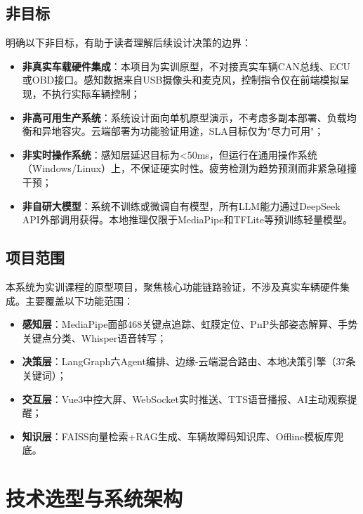 \documentclass[a4paper]{article}
\begin{document}
\subsection{非目标}

明确以下非目标，有助于读者理解后续设计决策的边界：

\begin{itemize}
    \item \textbf{非真实车载硬件集成}：本项目为实训原型，不对接真实车辆CAN总线、ECU或OBD接口。感知数据来自USB摄像头和麦克风，控制指令仅在前端模拟呈现，不执行实际车辆控制；
    \item \textbf{非高可用生产系统}：系统设计面向单机原型演示，不考虑多副本部署、负载均衡和异地容灾。云端部署为功能验证用途，SLA目标仅为"尽力可用"；
    \item \textbf{非实时操作系统}：感知层延迟目标为<50ms，但运行在通用操作系统（Windows/Linux）上，不保证硬实时性。疲劳检测为趋势预测而非紧急碰撞干预；
    \item \textbf{非自研大模型}：系统不训练或微调自有模型，所有LLM能力通过DeepSeek API外部调用获得。本地推理仅限于MediaPipe和TFLite等预训练轻量模型。
\end{itemize}

\subsection{项目范围}

本系统为实训课程的原型项目，聚焦核心功能链路验证，不涉及真实车辆硬件集成。主要覆盖以下功能范围：

\begin{itemize}
    \item \textbf{感知层}：MediaPipe面部468关键点追踪、虹膜定位、PnP头部姿态解算、手势关键点分类、Whisper语音转写；
    \item \textbf{决策层}：LangGraph六Agent编排、边缘-云端混合路由、本地决策引擎（37条关键词）；
    \item \textbf{交互层}：Vue3中控大屏、WebSocket实时推送、TTS语音播报、AI主动观察提醒；
    \item \textbf{知识层}：FAISS向量检索+RAG生成、车辆故障码知识库、Offline模板库兜底。
\end{itemize}

\section{技术选型与系统架构}
\end{document}
